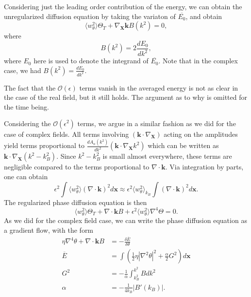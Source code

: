 \documentclass[12pt]{article}
\numberwithin{equation}{section}
\begin{document}
Considering just the leading order contribution of the energy, we can obtain the unregularized diffusion equation by taking the variaton of $\overline{E_0}$, and obtain
\begin{equation}
    \langle w_{\theta}^2 \rangle \Theta_T + \nabla_{\bm{X}}\bm{k}B(k^2)=0,
\end{equation}
where 
\begin{equation}
    B(k^2) = 2\frac{dE_0}{dk^2},
\end{equation}
where $E_0$ here is used to denote the integrand of $\overline{E_0}$. Note that in the complex case, we had $B(k^2)=\frac{dE_0}{dk^2}$.
\par The fact that the $\mathcal{O}(\epsilon)$ terms vanish in the averaged energy is not as clear in the case of the real field, but it still holds. The argument as to why is omitted for the time being. 
\par Considering the $\mathcal{O}(\epsilon^2)$ terms, we argue in a similar fashion as we did for the case of complex fields. All terms involving $(\bm{k}\cdot \nabla_{\bm{X}})$ acting on the amplitudes yield terms proportional to $\frac{dA_n(k^2)}{dk^2}(\bm{k}\cdot \nabla_{\bm{X}}k^2)$ which can be written as $\bm{k}\cdot \nabla_{\bm{X}}(k^2-k_B^2)$. Since $k^2-k_B^2$ is small almost everywhere, these terms are negligible compared to the terms proportional to $\nabla \cdot \bm{k}$. Via integration by parts, one can obtain
\begin{equation}
    \epsilon^2 \int \langle w_{\theta}^2 \rangle (\nabla \cdot \bm{k})^2 d\bm{x} \approx \epsilon^2 \langle w_{\theta}^2 \rangle_{k_B}\int (\nabla \cdot \bm{k})^2 d\bm{x}. 
\end{equation}
The regularized phase diffusion equation is then
\begin{equation}
    \langle w_{\theta}^2 \rangle \Theta_T + \nabla \cdot \bm{k}B + \epsilon^2 \langle w_{\theta}^2 \rangle\nabla^4 \Theta = 0.
\end{equation}
As we did for the complex field case, we can write the phase diffusion equation as a gradient flow, with the form
\begin{align}
    \eta \nabla^4 \theta + \nabla \cdot \bm{k}B &= -\frac{\delta \overline{E}}{\delta \theta}\\
    \overline{E} &= \int \left( \frac{1}{2}\eta|\nabla^2\theta|^2 + \frac{\alpha}{2}G^2 \right)d\bm{x}\\
    G^2 &= -\frac{1}{\alpha}\int_{k_B^2}^{k^2}Bdk^2\\
    \alpha &= -\frac{1}{4k_B}|B'(k_B)|.
\end{align}
\end{document}
